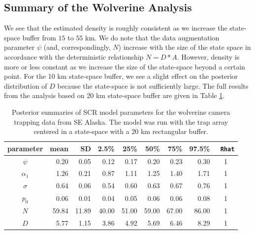 \subsection{Summary of the Wolverine Analysis}

We see that the estimated density is roughly consistent as we increase
the state-space buffer from $15$ to $55$ km. We do note that the data
augmentation parameter $\psi$ (and, correspondingly, $N$) increase with
the size of the state space in accordance with the deterministic
relationship $N= D*A$. However, density is more or less constant as we
increase the size of the state-space beyond a certain point.  For the
10 km state-space buffer, we see a slight effect on the posterior
distribution of $D$ because the state-space is not sufficiently large.
The full results from the analysis based on 20 km state-space buffer
are given in Table \ref{scr0.tab.wolverine-results2}.

\begin{table}
\centering
\caption{
Posterior summaries of SCR model parameters for the wolverine camera
trapping data from SE Alaska. The model was run with the trap array
centered in a state-space with a $20$ km
rectangular buffer.
}
\begin{tabular}{crrrrrrrc}
\hline \hline
parameter & mean & SD & 2.5\% & 25\% & 50\% & 75\% & 97.5\% &\mbox{\tt
  Rhat}  \\
\hline
$\psi$  &      0.20&  0.05&   0.12&   0.17&   0.20&   0.23&   0.30 &   1 \\
$\alpha_1$ &     1.26&  0.21&   0.87&   1.11&   1.25&   1.40&   1.71 &   1 \\
$\sigma$&      0.64&  0.06&   0.54&   0.60&   0.63&   0.67&   0.76 &   1 \\
$p_0$   &      0.06&  0.01&   0.04&   0.05&   0.06&   0.06&   0.08 &   1 \\
$N$    &     59.84& 11.89&  40.00&  51.00&  59.00&  67.00&  86.00 &   1 \\
$D$    &      5.77&  1.15&   3.86&   4.92&   5.69&   6.46&   8.29 &   1 \\
\end{tabular}
\label{scr0.tab.wolverine-results2}
\end{table}

